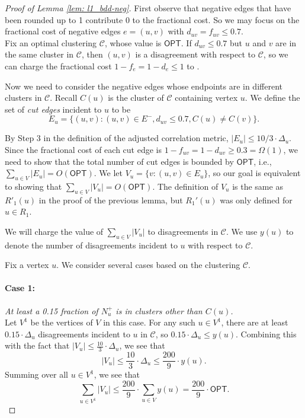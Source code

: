 \documentclass[11pt]{article}
\begin{document}
\begin{proof}[Proof of Lemma \ref{lem: l1_bdd-neg}]
First observe that negative edges that have been rounded up to 1 contribute 0 to the fractional cost. So we may focus on the fractional cost of negative edges $e=(u,v)$ with $d_{uv} = f_{uv} \leq 0.7$. \\


Fix an optimal clustering $\mathcal{C}$, whose value is $\textsf{OPT}$.
If $d_{uv} \leq 0.7$ but $u$ and $v$ are in the same cluster in $\mathcal{C}$,
then $(u,v)$ is a disagreement with respect to $\mathcal{C}$,
so we can charge the fractional cost $1-f_e = 1-d_e \leq 1$ to . 

Now we need to consider the negative edges whose endpoints are in different clusters in $\mathcal{C}$.
Recall $C(u)$ is the cluster of $\mathcal{C}$ containing vertex $u$. 
We define the set of \emph{cut edges} incident to $u$ to be
$$E_u = \{(u,v) : (u,v) \in E^-, d_{uv} \leq 0.7, C(u) \neq C(v) \}.$$ 

By Step 3 in the definition of the adjusted correlation metric, $|E_u| \leq 10/3\cdot\Delta_u$. Since the fractional cost of each cut edge is $1-f_{uv} = 1-d_{uv} \geq 0.3 = \Omega(1)$, we need to show that the total number of cut edges is bounded by $\textsf{OPT}$, i.e.,
$\sum_{u \in V} |E_u| = O(\textsf{OPT}).$
We let $V_u = \{v: (u,v) \in E_u\} $,
so our goal is equivalent to showing that 
$\sum_{u \in V}|V_u| = O(\textsf{OPT}).$
The definition of $V_u$ is the same as $R'_1(u)$ in the proof of the previous lemma, 
but $R_1'(u)$ was only defined for $u \in R_1$.


We will charge the value of $\sum_{u \in V} |V_u|$ to disagreements in $\mathcal{C}$. We use $y(u)$ to denote the number of disagreements incident to $u$ with respect to $\mathcal{C}$. 

Fix a vertex $u$. We consider several cases based on the clustering $\mathcal{C}$. 

\paragraph{Case 1: }\emph{At least a 0.15 fraction of $N_u^+$ is in clusters other than $C(u)$.}  \\
Let $V^1$ be the vertices of $V$ in this case. 
For any such $u \in V^1$, 
there are at least $0.15\cdot \Delta_u$ disagreements incident to $u$ in $\mathcal{C}$, 
so $0.15\cdot \Delta_u\leq y(u).$ 
Combining this with the fact that $|V_u| \leq \frac{10}{3} \cdot \Delta_u $, 
we see that
$$|V_u| \leq \frac{10}{3}\cdot \Delta_u \leq \frac{200}{9} \cdot y(u).$$
Summing over all $u \in V^1$, we see that
$$\boxed{\sum_{u \in V^1} |V_u| \leq \frac{200}{9} \cdot \sum_{u \in V} y(u) = \frac{200}{9} \cdot \textsf{OPT}.}$$


\end{proof}
\end{document}
